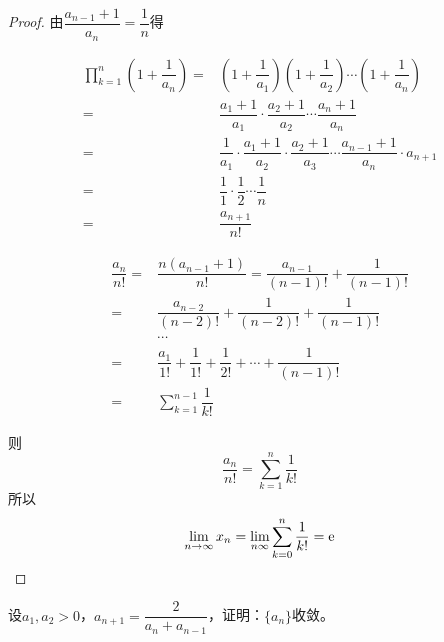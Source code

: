\begin{proof}

    由$\dfrac{a_{n-1}+1}{a_n} = \dfrac{1}{n}$得

    \begin{align*}
        \prod_{k=1}^{n}{\left(1+\dfrac{1}{a_n}\right)} = & \left(1+\dfrac{1}{a_1}\right) \left(1+\dfrac{1}{a_2}\right) \cdots \left(1+\dfrac{1}{a_n}\right) \\
        = & \dfrac{a_1 + 1}{a_1} \cdot \dfrac{a_2 + 1}{a_2} \cdots \dfrac{a_n + 1}{a_n} \\
        = & \dfrac{1}{a_1} \cdot \dfrac{a_1 + 1}{a_2} \cdot \dfrac{a_2 + 1}{a_3} \cdots \dfrac{a_{n-1} + 1}{a_n} \cdot a_{n+1} \\
        = & \dfrac{1}{1} \cdot \dfrac{1}{2} \cdots \dfrac{1}{n} \\
        = &\dfrac{a_{n+1}}{n!} 
    \end{align*}

    \begin{align*}
        \dfrac{a_n}{n!} = & \dfrac{n(a_{n-1}+1)}{n!} = \dfrac{a_{n-1}}{(n-1)!} + \dfrac{1}{(n-1)!} \\
        = & \dfrac{a_{n-2}}{(n-2)!} + \dfrac{1}{(n-2)!} + \dfrac{1}{(n-1)!} \\
        & \cdots \\ 
        = & \dfrac{a_1}{1!} + \dfrac{1}{1!} + \dfrac{1}{2!} + \cdots + \dfrac{1}{(n-1)!} \\
        = & \sum\limits_{k=1}^{n-1}{\dfrac{1}{k!}} 
    \end{align*}

    则
    $$\dfrac{a_n}{n!} = \sum\limits_{k=1}^{n}{\dfrac{1}{k!}}$$
    所以
    $$\lim\limits_{n\to\infty}{x_n} = \lim\limits_{n\infty}{\sum\limits_{k=0}^{n}{\dfrac{1}{k!}}} = \mathrm{e}$$

\end{proof}

\begin{proposition}

    设$a_1,a_2>0$，$a_{n+1} = \dfrac{2}{a_n + a_{n-1}}$，证明：$\{a_n\}$收敛。

\end{proposition}

